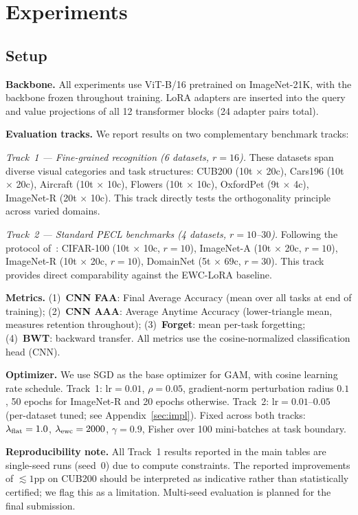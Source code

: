 \section{Experiments}
\label{sec:experiments}

\subsection{Setup}
\label{sec:setup}

\textbf{Backbone.}
All experiments use ViT-B/16 pretrained on ImageNet-21K,
with the backbone frozen throughout training.
LoRA adapters are inserted into the query and value projections
of all 12 transformer blocks (24 adapter pairs total).

\textbf{Evaluation tracks.}
We report results on two complementary benchmark tracks:

\emph{Track~1 — Fine-grained recognition (6 datasets, $r=16$).}
These datasets span diverse visual categories and task structures:
CUB200 (10t $\times$ 20c),
Cars196 (10t $\times$ 20c),
Aircraft (10t $\times$ 10c),
Flowers (10t $\times$ 10c),
OxfordPet (9t $\times$ 4c),
ImageNet-R (20t $\times$ 10c).
This track directly tests the orthogonality principle across varied domains.

\emph{Track~2 — Standard PECL benchmarks (4 datasets, $r=10$--$30$).}
Following the protocol of~\citet{zheng2025ewclora}:
CIFAR-100 (10t $\times$ 10c, $r=10$),
ImageNet-A (10t $\times$ 20c, $r=10$),
ImageNet-R (10t $\times$ 20c, $r=10$),
DomainNet (5t $\times$ 69c, $r=30$).
This track provides direct comparability against the EWC-LoRA baseline.

\textbf{Metrics.}
(1)~\textbf{CNN FAA}: Final Average Accuracy (mean over all tasks at end of training);
(2)~\textbf{CNN AAA}: Average Anytime Accuracy (lower-triangle mean, measures retention throughout);
(3)~\textbf{Forget}: mean per-task forgetting;
(4)~\textbf{BWT}: backward transfer.
All metrics use the cosine-normalized classification head (CNN).

\textbf{Optimizer.}
We use SGD as the base optimizer for GAM, with cosine learning rate schedule.
Track~1: $\mathrm{lr}=0.01$, $\rho=0.05$, gradient-norm perturbation radius $0.1$, 50 epochs for ImageNet-R and 20 epochs otherwise.
Track~2: $\mathrm{lr}=0.01$--$0.05$ (per-dataset tuned; see Appendix~\ref{sec:impl}).
Fixed across both tracks: $\lambda_{\mathrm{flat}}=1.0$, $\lambda_{\mathrm{ewc}}=2000$, $\gamma=0.9$,
Fisher over 100 mini-batches at task boundary.

\textbf{Reproducibility note.}
All Track~1 results reported in the main tables are single-seed runs (seed~0) due to compute constraints.
The reported improvements of $\lesssim 1$pp on CUB200 should be interpreted as indicative
rather than statistically certified; we flag this as a limitation.
Multi-seed evaluation is planned for the final submission.

